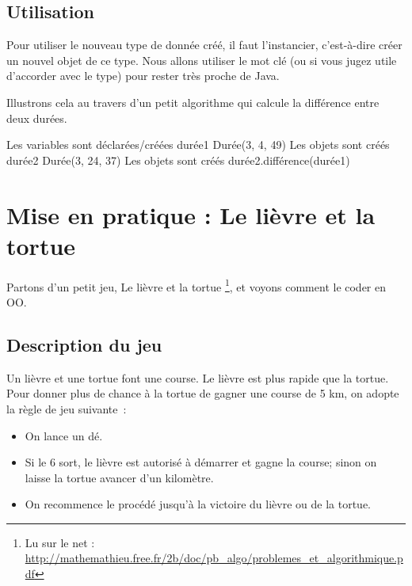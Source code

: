 	\subsection{Utilisation}

		Pour utiliser le nouveau type de donnée créé,
		il faut l'instancier, c'est-à-dire créer un nouvel objet de ce type.
		Nous allons utiliser le mot clé 
		(ou  si vous jugez utile d'accorder avec le type)
		pour rester très proche de Java.
		
		Illustrons cela au travers d'un petit algorithme
		qui calcule la différence entre deux durées.
		
		\begin{LDA}
					\RComment Les variables sont déclarées/créées
				\Let durée1 \Gets {} Durée(3, 4, 49)	\RComment Les objets sont créés
				\Let durée2 \Gets {} Durée(3, 24, 37)	\RComment Les objets sont créés
				\Write durée2.différence(durée1)
			\EndAlgo
		\end{LDA}
			
\section{Mise en pratique : Le lièvre et la tortue}

	Partons d'un petit jeu, \og{}Le lièvre et la tortue\fg{}%
	\footnote{%
		Lu sur le net : 
		\url{http://mathemathieu.free.fr/2b/doc/pb_algo/problemes_et_algorithmique.pdf}
	}, 
	et voyons comment le coder en OO.

	\subsection{Description du jeu}
	
		Un lièvre et une tortue font une course.
		Le lièvre est plus rapide que la tortue.
		Pour donner plus de chance à la tortue de gagner une course de 5 km, 
		on adopte la règle de jeu suivante~:
		\begin{itemize}
		\item 
			On lance un dé. 
		\item
			Si le 6 sort, 
			le lièvre est autorisé à démarrer et gagne la course; 
			sinon on laisse la tortue avancer d’un kilomètre.
		\item
			On recommence le procédé jusqu'à la victoire du lièvre ou de la tortue.
		\end{itemize}
		
